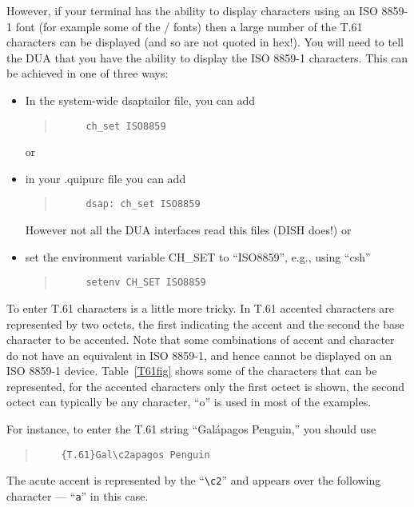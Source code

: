 However, if your terminal has the ability to display characters 
using an ISO 8859-1 font 
(for example some of the \xwindows/ fonts)
then a large
number of the T.61 characters can be displayed (and so are not quoted in hex!).
You will need to tell the DUA that you have the ability to display the
ISO 8859-1 characters.  This can be achieved in one of three ways:
\begin{itemize}
\item In the system-wide dsaptailor file, you can add
\begin{quote}\begin{verbatim}
     ch_set ISO8859
\end{verbatim}\end{quote}
or
\item in your .quipurc file you can add
\begin{quote}\begin{verbatim}
     dsap: ch_set ISO8859
\end{verbatim}\end{quote}
However not all the DUA interfaces read this files (DISH does!) or
\item set the environment variable CH\_SET to ``ISO8859'', e.g., using ``csh''
\begin{quote}\begin{verbatim}
     setenv CH_SET ISO8859
\end{verbatim}\end{quote}
\end{itemize}

To enter T.61 characters is a little more tricky.
In T.61 
accented characters are represented by two octets, the first indicating the
accent and the second the base character to be accented. Note that some
combinations of accent and character do not have an equivalent in ISO 8859-1,
and hence cannot be displayed on an ISO 8859-1 device.
Table~\ref{T61fig} shows some of the characters that can be represented,
for
the accented characters only the first octect is shown, the second
octect can typically be any character, ``o'' is used in most of the
examples.

For instance,  to enter the T.61 string ``Gal\'{a}pagos Penguin,'' you
should use
\begin{quote}\begin{verbatim}
	{T.61}Gal\c2apagos Penguin
\end{verbatim}\end{quote}
The acute accent is represented by the ``\verb+\c2+'' and appears
over the following character --- ``\verb+a+'' in this case.

